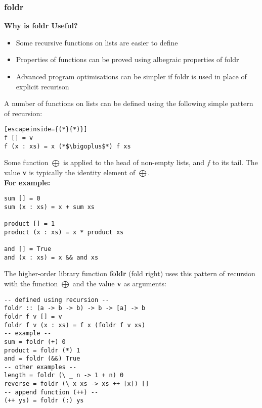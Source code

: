 \subsubsection{foldr}
\textbf{Why is foldr Useful?}
\begin{itemize}
    \item Some recursive functions on lists are easier to define
    \item Properties of functions can be proved using albegraic properties of foldr
    \item Advanced program optimisations can be simpler if foldr is used in place of explicit recurison
\end{itemize}
A number of functions on lists can be defined using the following simple pattern of recursion:
\begin{lstlisting}[escapeinside={(*}{*)}]
f [] = v
f (x : xs) = x (*$\bigoplus$*) f xs
\end{lstlisting}
Some function $\bigoplus$ is applied to the head of non-empty lists, and $f$ to its tail.
The value \textbf{v} is typically the identity element of $\bigoplus$.\\
\textbf{For example:}
\begin{lstlisting}
sum [] = 0
sum (x : xs) = x + sum xs

product [] = 1
product (x : xs) = x * product xs

and [] = True
and (x : xs) = x && and xs
\end{lstlisting}
The higher-order library function \textbf{foldr} (fold right) uses this pattern of recursion with the function $\bigoplus$ and the value \textbf{v} as arguments:
\begin{lstlisting}
-- defined using recursion --
foldr :: (a -> b -> b) -> b -> [a] -> b
foldr f v [] = v
foldr f v (x : xs) = f x (foldr f v xs)
-- example --
sum = foldr (+) 0
product = foldr (*) 1
and = foldr (&&) True
-- other examples -- 
length = foldr (\ _ n -> 1 + n) 0
reverse = foldr (\ x xs -> xs ++ [x]) [] 
-- append function (++) --
(++ ys) = foldr (:) ys
\end{lstlisting} 

